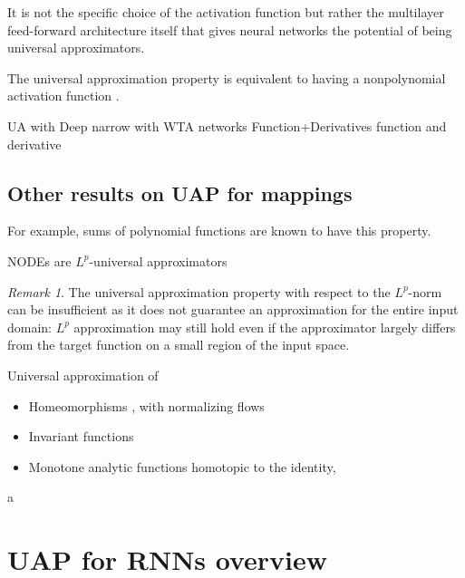 \documentclass{article}
\theoremstyle{definition} \newtheorem{definition}{Definition}
\theoremstyle{remark} \newtheorem{remark}{Remark}
\newcounter{ct}
\begin{document}
It is not the specific choice of the activation function but rather the multilayer feed-forward architecture itself that gives neural networks the potential of being universal approximators\citep{hornik1991approximation}.

The universal approximation property is equivalent to having a nonpolynomial activation function \citep{pinkus1999approximation}.

\citep{mhaskar1997neural}
\citep{leshno1993multilayer}
UA with Deep narrow \citep{kidger2020universal}
with WTA networks \citep{maass2000wta}
Function+Derivatives \citep{hornik1990universal}
function and derivative \citep{li1996simultaneous}


\subsection{Other results on UAP for mappings}
For example, sums of polynomial functions are known to have this property\citep{llavona1986approximation}.
 
NODEs are $L^p$-universal approximators \citep{li2022deep,li2022deeparxiv}
\begin{remark}
The universal approximation property with respect to the $L^p$-norm can be insufficient as it does not guarantee an approximation for the entire input domain:
 $L^p$ approximation may still hold even if the approximator largely differs from the target function on a small region of the input space.
\end{remark}


Universal approximation of 
\begin{itemize}
\item Homeomorphisms \citep{zhang2020approximation}, with normalizing flows \citep{papamakarios2021normalizing}
\item Invariant functions\citep{li2022deep}
\item Monotone analytic functions homotopic to the identity\citep{tabuada2020universal}, \citep{tabuada2022universal}
\end{itemize}


a\citep{marchi2021training}





\newpage
\section{UAP for RNNs overview}
\end{document}
